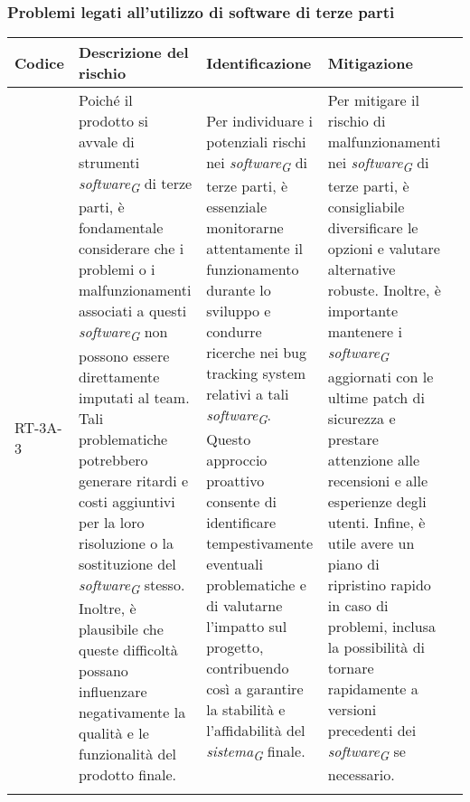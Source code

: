 \subsubsection{Problemi legati all'utilizzo di software di terze parti} \label{sec:swThirdParts}
\begin{table}[H]
    \centering
    \begin{tabularx}{\textwidth}{l>{\RaggedRight}X>{\RaggedRight}X>{\RaggedRight}X>{\RaggedRight}X}
    \toprule
    \rowcolor{gray!50}
    \textbf{Codice} & \textbf{Descrizione del rischio} & \textbf{Identificazione} & \textbf{Mitigazione} \\
    \midrule
    \addlinespace 
    RT-3A-3 & 
    Poiché il prodotto si avvale di strumenti \textit{software}\textsubscript{\textit{G}} di terze parti, è fondamentale considerare che i problemi o i malfunzionamenti associati a questi \textit{software}\textsubscript{\textit{G}} non possono essere direttamente imputati al team. Tali problematiche potrebbero generare ritardi e costi aggiuntivi per la loro risoluzione o la sostituzione del \textit{software}\textsubscript{\textit{G}} stesso. Inoltre, è plausibile che queste difficoltà possano influenzare negativamente la qualità e le funzionalità del prodotto finale. &
    Per individuare i potenziali rischi nei \textit{software}\textsubscript{\textit{G}} di terze parti, è essenziale monitorarne attentamente il funzionamento durante lo sviluppo e condurre ricerche nei bug tracking system relativi a tali \textit{software}\textsubscript{\textit{G}}. Questo approccio proattivo consente di identificare tempestivamente eventuali problematiche e di valutarne l'impatto sul progetto, contribuendo così a garantire la stabilità e l'affidabilità del \textit{sistema}\textsubscript{\textit{G}} finale.&
    Per mitigare il rischio di malfunzionamenti nei \textit{software}\textsubscript{\textit{G}} di terze parti, è consigliabile diversificare le opzioni e valutare alternative robuste. Inoltre, è importante mantenere i \textit{software}\textsubscript{\textit{G}} aggiornati con le ultime patch di sicurezza e prestare attenzione alle recensioni e alle esperienze degli utenti. Infine, è utile avere un piano di ripristino rapido in caso di problemi, inclusa la possibilità di tornare rapidamente a versioni precedenti dei \textit{software}\textsubscript{\textit{G}} se necessario. \\
    \bottomrule
    \addlinespace 
    \end{tabularx}
\end{table}

